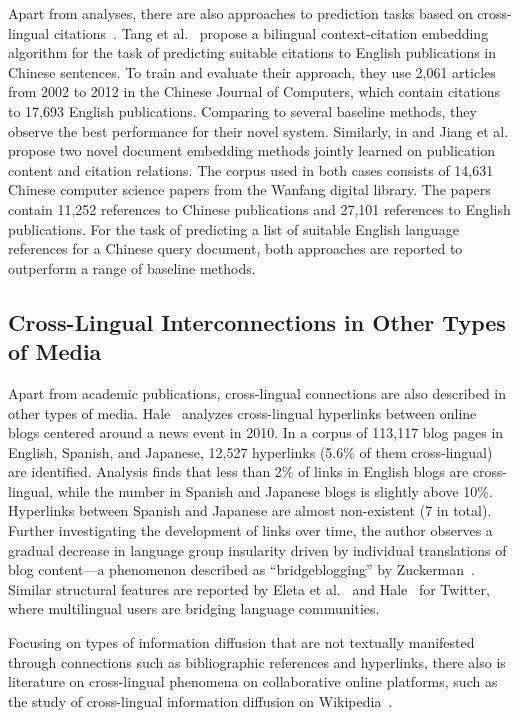 Apart from analyses, there are also approaches to prediction tasks based on cross-lingual citations~\cite{Tang2014,Jiang2018,Jiang2018b,Ma2020}. Tang et al.~\cite{Tang2014} propose a bilingual context-citation embedding algorithm for the task of predicting suitable citations to English publications in Chinese sentences. To train and evaluate their approach, they use 2,061 articles from 2002 to 2012 in the Chinese Journal of Computers, which contain citations to 17,693 English publications. Comparing to several baseline methods, they observe the best performance for their novel system. Similarly, in \cite{Jiang2018} and \cite{Jiang2018b} Jiang et al. propose two novel document embedding methods jointly learned on publication content and citation relations. The corpus used in both cases consists of 14,631 Chinese computer science papers from the Wanfang digital library. The papers contain 11,252 references to Chinese publications and 27,101 references to English publications. For the task of predicting a list of suitable English language references for a Chinese query document, both approaches are reported to outperform a range of baseline methods.

\subsection{Cross-Lingual Interconnections in Other Types of Media}

Apart from academic publications, cross-lingual connections are also described in other types of media. Hale~\cite{Hale2012} analyzes cross-lingual hyperlinks between online blogs centered around a news event in 2010. In a corpus of 113,117 blog pages in English, Spanish, and Japanese, 12,527 hyperlinks (5.6\% of them cross-lingual) are identified. Analysis finds that less than 2\% of links in English blogs are cross-lingual, while the number in Spanish and Japanese blogs is slightly above 10\%. Hyperlinks between Spanish and Japanese are almost non-existent (7 in total). Further investigating the development of links over time, the author observes a gradual decrease in language group insularity driven by individual translations of blog content---a phenomenon described as ``bridgeblogging'' by Zuckerman~\cite{Zuckerman2008}.
Similar structural features are reported by Eleta et al.~\cite{Eleta2012} and Hale~\cite{Hale2014a} for Twitter, where multilingual users are bridging language communities.

Focusing on types of information diffusion that are not textually manifested through connections such as bibliographic references and hyperlinks, there also is literature on cross-lingual phenomena on collaborative online platforms, such as the study of cross-lingual information diffusion on Wikipedia~\cite{Kim2016,Samoilenko2016}.

